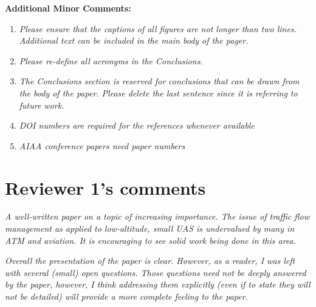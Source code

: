\documentclass[submit]{aiaa-pretty}
\begin{document}
\textbf{Additional Minor Comments:}
\begin{enumerate}
\item \textit{Please ensure that the captions of all figures are not longer than two lines.  Additional text can be included in the main body of the pager.}
\item \textit{Please re-define all acronyms in the Conclusions.}
\item \textit{The Conclusions section is reserved for conclusions that can be drawn from the body of the paper.  Please delete the last sentence since it is referring to future work.}
\item \textit{DOI numbers are required for the references whenever available}
\item \textit{AIAA conference papers need paper numbers}
\end{enumerate}

\section{Reviewer 1's comments}

\textit{A well-written paper on a topic of increasing importance.  The issue of traffic flow management as applied to low-altitude, small UAS is undervalued by many in ATM and aviation.  It is encouraging to see solid work being done in this area.}

\textit{Overall the presentation of the paper is clear.  However, as a reader, I was left with several (small) open questions.  Those questions need not be deeply answered by the paper, however, I think addressing them explicitly (even if to state they will not be detailed) will provide a more complete feeling to the paper.}
\end{document}

